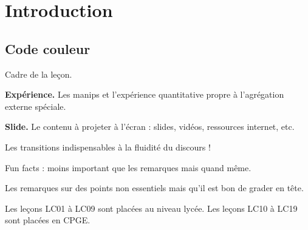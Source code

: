 \chapter*{Introduction}

\section*{Code couleur}

\begin{header}
Cadre de la leçon.
\end{header}

\begin{experience}
\textbf{Expérience.}
Les manips et l'expérience quantitative propre à l'agrégation externe spéciale.
\end{experience}

\begin{slide}
\textbf{Slide.}
Le contenu à projeter à l'écran : slides, vidéos, ressources internet, etc.
\end{slide}

\begin{transition}
Les transitions indispensables à la fluidité du discours !
\end{transition}

\begin{funfact}
Fun facts : moins important que les remarques mais quand même.
\end{funfact}

\begin{remarque}
Les remarques sur des points non essentiels mais qu'il est bon de grader en tête.
\end{remarque}

Les leçons LC01 à LC09 sont placées au niveau lycée.
Les leçons LC10 à LC19 sont placées en CPGE.